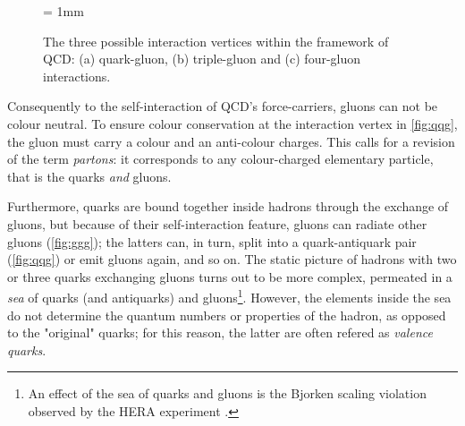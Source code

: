 \begin{figure}[H]
\begin{center}
\unitlength = 1mm
\end{center}
\caption{The three possible interaction vertices within the framework of QCD: (a) quark-gluon, (b) triple-gluon and (c) four-gluon interactions.}
\label{fig:FeynmanDiagQCD}
\end{figure}

Consequently to the self-interaction of QCD's force-carriers, gluons can not be colour neutral. To ensure colour conservation at the interaction vertex in \fig\ref{fig:qqg}, the gluon must carry a colour and an anti-colour charges. This calls for a revision of the term \textit{partons}: it corresponds to any colour-charged elementary particle, that is the quarks \textit{and} gluons. 

Furthermore, quarks are bound together inside hadrons through the exchange of gluons, but because of their self-interaction feature, gluons can radiate other gluons (\fig\ref{fig:ggg}); the latters can, in turn, split into a quark-antiquark pair (\fig\ref{fig:qqg}) or emit gluons again, and so on. The static picture of hadrons  with two or three quarks exchanging gluons turns out to be more complex, permeated in a \textit{sea} of quarks (and antiquarks) and gluons\footnote{An effect of the sea of quarks and gluons is the Bjorken scaling violation observed by the HERA experiment \cite{braibantParticlesFundamentalInteractions2012}\cite{thomsonModernParticlePhysics2013}.}. However, the elements inside the sea do not determine the quantum numbers or properties of the hadron, as opposed to the "original" quarks; for this reason, the latter are often refered as \textit{valence quarks}.

